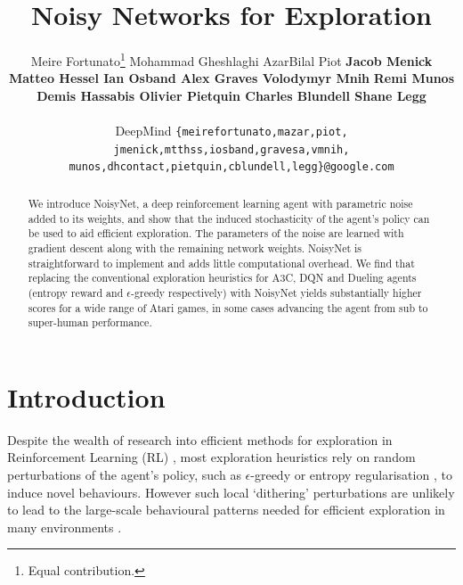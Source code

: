 \documentclass{article}
\title{Noisy Networks for Exploration}
\author{Meire Fortunato\thanks{Equal contribution.}
\quad Mohammad Gheshlaghi Azar\footnotemark[1]
\quad Bilal Piot \footnotemark[1] \And
\textbf{Jacob Menick
\quad  Matteo Hessel
\quad Ian Osband
\quad Alex Graves
\quad Volodymyr Mnih} \And
\textbf{Remi Munos
\quad Demis Hassabis 
\quad Olivier Pietquin
\quad Charles Blundell 
\quad Shane Legg}  \\ \\
DeepMind
  \texttt{\{meirefortunato,mazar,piot,} \\
  \texttt{jmenick,mtthss,iosband,gravesa,vmnih,}\\
  \texttt{munos,dhcontact,pietquin,cblundell,legg\}@google.com} \\
}
\newcommand{\algoinit}{NoisyNet}
\begin{document}
\maketitle



\begin{abstract}
We introduce \algoinit{}, a deep reinforcement learning agent with  parametric noise added to its weights, and show that the induced stochasticity of the agent's policy can be used to aid efficient exploration.
The parameters of the noise are learned with gradient descent along with the remaining network weights. \algoinit{} is straightforward to implement and adds little computational overhead.
We find that replacing the conventional exploration heuristics for A3C, DQN and Dueling  agents (entropy reward and $\epsilon$-greedy respectively) with NoisyNet yields substantially higher scores for a wide range of Atari games, in some cases advancing the agent from sub to super-human performance.
\end{abstract}
%
\section{Introduction}
\label{sec:introduction}
Despite the wealth of research into efficient methods for exploration in Reinforcement Learning (RL) \citep{kearns2002near,jaksch2010near}, most exploration heuristics rely on random perturbations of the agent's policy, such as $\epsilon$-greedy \citep{sutton1998reinforcement} or entropy regularisation \citep{williams1992simple}, to induce novel behaviours. 
However such local `dithering' perturbations are unlikely to lead to the large-scale behavioural patterns needed for efficient exploration in many environments \citep{osband2017deep}.
\end{document}
